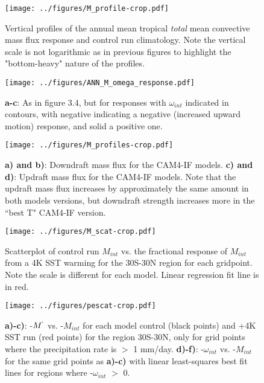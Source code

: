 \documentclass[letterpaper,12pt,titlepage,oneside,final]{book}
\begin{document}
\newpage
\begin{figure}[H]
\centering
\noindent\texttt{[image: ../figures/M\_profile-crop.pdf]}\hfill
\caption{Vertical profiles of the annual mean tropical \textit{total} mean convective mass flux response and control run climatology. Note the vertical scale is not logarithmic as in previous figures to highlight the "bottom-heavy" nature of the profiles.}
\end{figure}

\begin{figure}[H]
\centering
\noindent\texttt{[image: ../figures/ANN\_M\_omega\_response.pdf]}\hfill
\caption{\textbf{a-c}: As in figure 3.4, but for responses with $\omega_{int}$ indicated in contours, with negative indicating a negative (increased upward motion) response, and solid a positive one.}
\end{figure}


\newpage
\begin{figure}[H]
\centering
\noindent\texttt{[image: ../figures/M\_profiles-crop.pdf]}\hfill
\caption{\textbf{a) and b)}: Downdraft mass flux for the CAM4-IF models. \textbf{c) and d)}: Updraft mass flux for the CAM4-IF models. Note that the updraft mass flux increases by approximately the same amount in both models versions, but downdraft strength increases more in the ``best T" CAM4-IF version.}
\end{figure}

\begin{figure}[H]
\centering
\noindent\texttt{[image: ../figures/M\_scat-crop.pdf]}\hfill
\caption{Scatterplot of control run $M_{int}$ vs. the fractional response of $M_{int}$ from a 4K SST warming for the 30S-30N region for each gridpoint. Note the scale is different for each model. Linear regression fit line is in red.}
\end{figure}

\begin{figure}[H]
\centering
\noindent\texttt{[image: ../figures/pescat-crop.pdf]}\hfill
\caption{\textbf{a)-c)}: -$M^{`}$ vs. -$M_{int}$ for each model control (black points) and +4K SST run (red points) for the region 30S-30N, only for grid points where the precipitation rate is $>$ 1 mm/day. \textbf{d)-f)}: -$\omega_{int}$ vs. -$M_{int}$ for the same grid points as \textbf{a)-c)} with linear least-squares best fit lines for regions where -$\omega_{int}$ $>$ 0. }
\end{figure}
\end{document}
